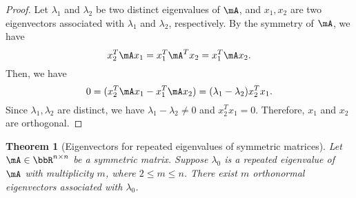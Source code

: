 \documentclass[11pt]{article}
\theoremstyle{plain}
\newtheorem{thm}{Theorem}[section]
\theoremstyle{definition}
\begin{document}
\begin{proof}
	Let $\lambda_1$ and $\lambda_2$ be two distinct eigenvalues of $\mA$, and  $x_1, x_2$ are two eigenvectors associated with $\lambda_1$ and $\lambda_2$, respectively. By the symmetry of $\mA$, we have
	\[ x_2^T \mA x_1 = x_1^T \mA^T x_2  = x_1^T \mA x_2.\]
	Then, we have
	\[  0 = ( x_2^T \mA x_1 -  x_1^T \mA x_2 ) = (\lambda_1 - \lambda_2) x_2^T x_1. \]
	Since $\lambda_1, \lambda_2$ are distinct, we have $\lambda_1 - \lambda_2 \neq 0$ and $x_2^T x_1 = 0$. Therefore, $x_1$ and $x_2$ are orthogonal. 
\end{proof}

\begin{thm}[Eigenvectors for repeated eigenvalues of symmetric matrices]\label{thm:symmrepeat} Let  $\mA \in \bbR^{n \times n}$ be a symmetric matrix. Suppose $\lambda_0$ is a repeated eigenvalue of $\mA$ with multiplicity $m$, where $2 \leq m \leq n$. There exist $m$ orthonormal eigenvectors associated with $\lambda_0$.
\end{thm}
\end{document}
